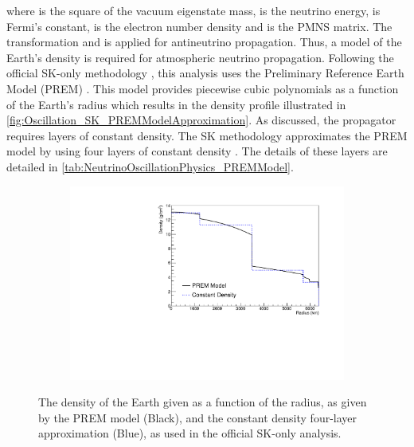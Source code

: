 where  is the square of the  vacuum eigenstate mass,  is the neutrino energy,  is Fermi's constant,  is the electron number density and  is the PMNS matrix. The transformation  and  is applied for antineutrino propagation. Thus, a model of the Earth's density is required for atmospheric neutrino propagation. Following the official SK-only methodology \cite{thesis_roger}, this analysis uses the Preliminary Reference Earth Model (PREM) \cite{Dziewonski1981-sp}. This model provides piecewise cubic polynomials as a function of the Earth's radius which results in the density profile illustrated in \autoref{fig:Oscillation_SK_PREMModelApproximation}. As discussed, the propagator requires layers of constant density. The SK methodology approximates the PREM model by using four layers of constant density \cite{thesis_roger}. The details of these layers are detailed in \autoref{tab:NeutrinoOscillationPhysics_PREMModel}.

\begin{figure}[h]
  \begin{subfigure}[t]{0.8\textwidth}
    \includegraphics[width=\textwidth, trim={0mm 0mm 0mm 0mm}, clip,page=1]{Figures/Oscillation/DensityComparison.pdf}
  \end{subfigure}
  \caption{The density of the Earth given as a function of the radius, as given by the PREM model (Black), and the constant density four-layer approximation (Blue), as used in the official SK-only analysis.}
  \label{fig:Oscillation_SK_PREMModelApproximation}
\end{figure}

